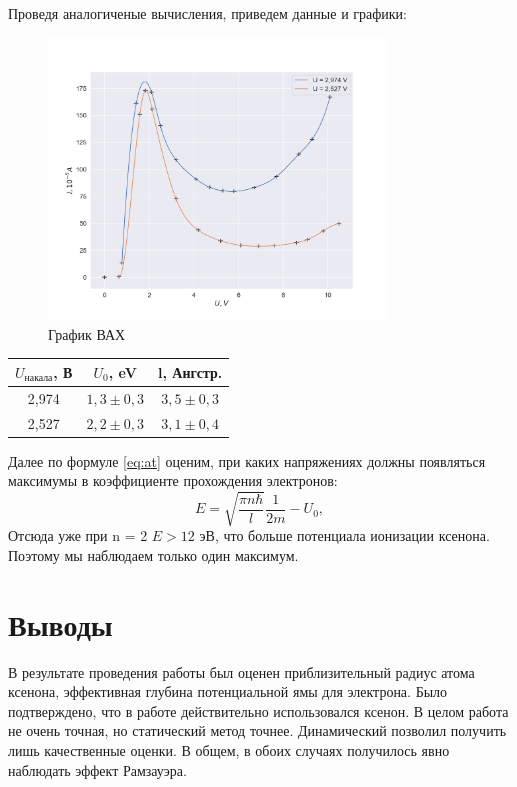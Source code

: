 \documentclass[a4paper, 12pt]{article}
\begin{document}
Проведя аналогиченые вычисления, приведем данные и графики:
\begin{figure}[H]
    \centering
    \includegraphics[width=0.8\textwidth]{plot.png}
    \caption{График ВАХ}
    \label{fig:plo1}
\end{figure}

\begin{table}[H]
	\centering
	\begin{tabular}{|c|c|c|}
	\hline
	$U_\text{накала}$, В & $U_0$, eV       & l, Ангстр.    \\ \hline
	2,974               & $1,3 \pm 0,3$ & $3,5 \pm 0,3$ \\ \hline
	2,527               & $2,2 \pm 0,3$ & $3,1 \pm 0,4$ \\ \hline
	\end{tabular}
\end{table}
Далее по формуле \eqref{eq:at} оценим, при каких напряжениях должны появляться максимумы в коэффициенте прохождения электронов:
\[
	E = \sqrt{\frac{\pi n \hbar}{l}} \frac{1}{2 m} - U_0,
\]
Отсюда уже при n = 2 $E > 12 \text{ эВ}$, что больше потенциала ионизации ксенона. Поэтому мы наблюдаем только один максимум.
\section{Выводы}
В результате проведения работы был оценен приблизительный радиус атома ксенона, эффективная глубина потенциальной ямы для электрона. Было подтверждено, что в работе действительно использовался ксенон. В целом работа не очень точная, но статический метод точнее. Динамический позволил получить лишь качественные оценки. В общем, в обоих случаях получилось явно наблюдать эффект Рамзауэра.
\end{document}
